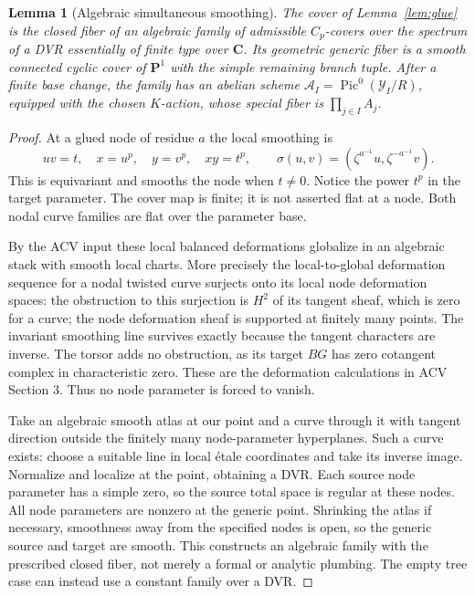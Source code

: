 \documentclass[11pt]{article}
\newtheorem{lemma}[theorem]{Lemma}
\theoremstyle{definition}
\newcommand{\C}{\mathbf C}
\newcommand{\Pic}{\operatorname{Pic}}
\begin{document}
\begin{lemma}[Algebraic simultaneous smoothing]\label{lem:smooth}
The cover of Lemma~\ref{lem:glue} is the closed fiber of an algebraic family
of admissible $C_p$-covers over the spectrum of a DVR essentially of finite
type over $\C$. Its geometric generic fiber is a smooth connected cyclic
cover of $\mathbf P^1$ with the simple remaining branch tuple. After a finite
base change, the family has an abelian scheme
$\mathcal A_I=\Pic^0(\mathcal Y_I/R)$, equipped with the chosen $K$-action,
whose special fiber is $\prod_{j\in I}A_j$.
\end{lemma}
\begin{proof}
At a glued node of residue $a$ the local smoothing is
\[
 uv=t,\quad x=u^p,\quad y=v^p,\quad xy=t^p,\qquad
 \sigma(u,v)=(\zeta^{a^{-1}}u,\zeta^{-a^{-1}}v).
\]
This is equivariant and smooths the node when $t\ne0$. Notice the power
$t^p$ in the target parameter. The cover map is finite; it is not asserted
flat at a node. Both nodal curve families are flat over the parameter base.

By the ACV input these local balanced deformations globalize in an algebraic
stack with smooth local charts. More precisely the local-to-global deformation
sequence for a nodal twisted curve surjects onto its local node deformation
spaces: the obstruction to this surjection is $H^2$ of its tangent sheaf,
which is zero for a curve; the node deformation sheaf is supported at finitely
many points. The invariant smoothing line survives exactly because the tangent
characters are inverse. The torsor adds no obstruction, as its target $BG$ has
zero cotangent complex in characteristic zero. These are the deformation
calculations in ACV Section 3. Thus no node parameter is forced to vanish.

Take an algebraic smooth atlas at our point and a curve through it with tangent
direction outside the finitely many node-parameter hyperplanes. Such a curve
exists: choose a suitable line in local \'etale coordinates and take its
inverse image. Normalize and localize at the point, obtaining a DVR. Each
source node parameter has a simple zero, so the source total space is regular
at these nodes. All node parameters are nonzero at the generic point.
Shrinking the atlas if
necessary, smoothness away from the specified nodes is open, so the generic
source and target are smooth. This constructs an algebraic family with the
prescribed closed fiber, not merely a formal or analytic plumbing. The empty
tree case can instead use a constant family over a DVR.


\end{proof}
\end{document}
